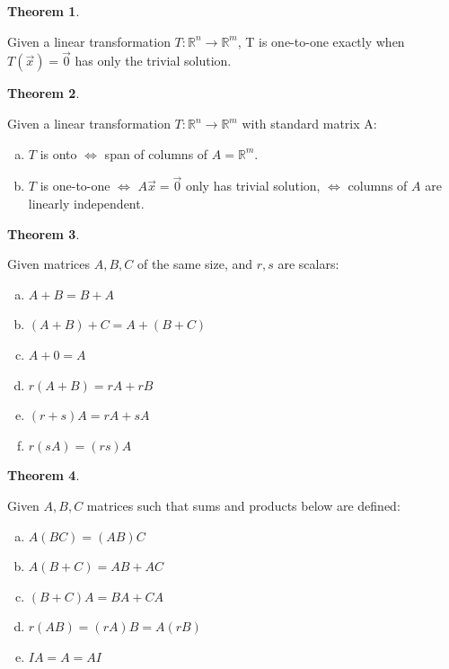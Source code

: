 \documentclass[a4paper,12pt]{article}
\theoremstyle{definition}
\newtheorem{theorem}{Theorem}
\theoremstyle{definition}
\newcommand{\mateq}[3]{#1#2 = #3}
\begin{document}
	\begin{theorem}
		\label{thm:lin-trans-one-to-one-thm}
		
		Given a linear transformation $T: \mathbb{R}^n \rightarrow \mathbb{R}^m$, T is one-to-one exactly when $\mateq{T}{(\vec{x})}{\vec{0}}$ has only the trivial solution.
	\end{theorem}
	
	\begin{theorem}
		\label{thm:onto-and-one-to-one-thm}
		
		Given a linear transformation $T: \mathbb{R}^n \rightarrow \mathbb{R}^m$ with standard matrix A:
		\begin{enumerate}[a.]
			\item $T$ is onto $\Leftrightarrow$ span of columns of $A = \mathbb{R}^m$.
			
			\item $T$ is one-to-one $\Leftrightarrow$ $\mateq{A}{\vec{x}}{\vec{0}}$ only has trivial solution, $\Leftrightarrow$ columns of $A$ are linearly independent.
		\end{enumerate}
	\end{theorem}
	
	\begin{theorem}
		\label{thm:mat-add-sclmult-props}
		
		Given matrices $A, B, C$ of the same size, and $r, s$ are scalars:
		\begin{enumerate}[a.]
			\item $A + B = B + A$
			\item $(A + B) + C = A + (B + C)$
			\item $A + 0 = A$
			\item $r(A + B) = rA + rB$
			\item $(r + s)A = rA + sA$
			\item $r(sA) = (rs)A$
		\end{enumerate}
	\end{theorem}
	
	\begin{theorem}
		\label{thm:mat-mult-props}
		
		Given $A, B, C$ matrices such that sums and products below are defined:
		
		\begin{enumerate}[a.]
			\item $A(BC) = (AB)C$
			\item $A(B + C) = AB + AC$
			\item $(B + C)A = BA + CA$
			\item $r(AB) = (rA)B = A(rB)$
			\item $IA = A = AI$
		\end{enumerate}
	\end{theorem}
	
\end{document}
